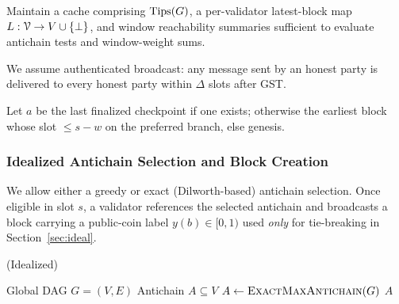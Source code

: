 
\begin{definition}[\ForkChoiceUpdate]
Maintain a cache comprising $\mathrm{Tips}(G)$, a per-validator latest-block map $L:\mathcal{V}\to V\cup\{\bot\}$, and window reachability summaries sufficient to evaluate antichain tests and window-weight sums.
\end{definition}
\begin{definition}[\Broadcast]
We assume authenticated broadcast: any message sent by an honest party is delivered to every honest party within $\Delta$ slots after GST.
\end{definition}
\begin{definition}
Let $a$ be the last finalized checkpoint if one exists; otherwise the earliest block whose slot $\le s-w$ on the preferred branch, else genesis.
\end{definition}



\subsubsection{Idealized Antichain Selection and Block Creation}
We allow either a greedy or exact (Dilworth-based) antichain selection. Once eligible in slot $s$, a validator references
the selected antichain and broadcasts a block carrying a public-coin label $y(b)\in[0,1)$ used \emph{only} for tie-breaking in Section~\ref{sec:ideal}. 



\begin{algorithm}[H]
\caption{\AntichainSelection (Idealized)}
\label{alg:ideal-antichain}
\begin{algorithmic}[1]
\Require Global DAG $G=(V,E)$
\Ensure Antichain $A\subseteq V$
\State $A \gets \textsc{ExactMaxAntichain}(G)$ 
\State \Return $A$
\end{algorithmic}
\end{algorithm}

